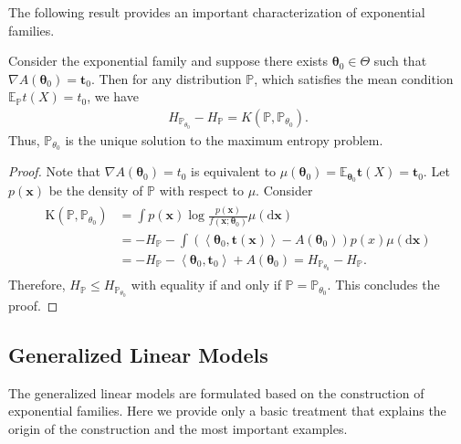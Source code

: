 The following result provides an important characterization of exponential families.
\begin{thm}
    Consider the exponential family and suppose there exists $\boldsymbol{\theta}_0 \in \Theta$ such that $\nabla A\left(\boldsymbol{\theta}_0\right)=\boldsymbol{t}_0$. Then for any distribution $\mathbb{P}$, which satisfies the mean condition $\mathbb{E}_{\mathbb{P}} t(X)=t_0$, we have
\begin{align*}
H_{\mathbb{P}_{\theta_0}}-H_{\mathbb{P}}=K\left(\mathbb{P}, \mathbb{P}_{\theta_0}\right) .
\end{align*}
Thus, $\mathbb{P}_{\theta_0}$ is the unique solution to the maximum entropy problem.
\end{thm}
\begin{proof}
    Note that $\nabla A\left(\boldsymbol{\theta}_0\right)=t_0$ is equivalent to $\mu\left(\boldsymbol{\theta}_0\right)=\mathbb{E}_{\boldsymbol{\theta}_0} \mathbf{t}(X)=\mathbf{t}_0$. Let $p(\mathbf{x})$ be the density of $\mathbb{P}$ with respect to $\mu$. Consider
\begin{align*}
\begin{aligned}
\mathrm{K}\left(\mathbb{P}, \mathbb{P}_{\theta_0}\right) & =\int p(\mathbf{x}) \log \frac{p(\mathbf{x})}{f\left(\mathbf{x} ; \boldsymbol{\theta}_0\right)} \mu(\mathrm{d} \mathbf{x}) \\
& =-H_{\mathbb{P}}-\int\left(\left\langle\boldsymbol{\theta}_0, \mathbf{t}(\mathbf{x})\right\rangle-A\left(\boldsymbol{\theta}_0\right)\right) p(x) \mu(\mathrm{d} \mathbf{x}) \\
& =-H_{\mathbb{P}}-\left\langle\boldsymbol{\theta}_0, \mathbf{t}_0\right\rangle+A\left(\boldsymbol{\theta}_0\right) = H_{\mathbb{P}_{\theta_0}}-H_{\mathbb{P}} .
\end{aligned}
\end{align*}
Therefore, $H_{\mathbb{P}} \leq H_{\mathbb{P}_{\theta_0}}$ with equality if and only if $\mathbb{P}=\mathbb{P}_{\theta_0}$. This concludes the proof.
\end{proof}
\subsection{Generalized Linear Models}
The generalized linear models are formulated based on the construction of exponential families. Here we provide only a basic treatment that explains the origin of the construction and the most important examples.

